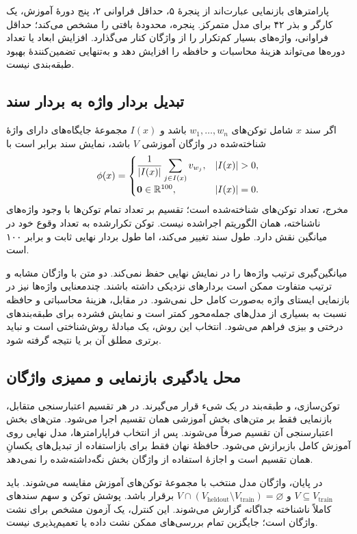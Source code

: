 پارامترهای بازنمایی عبارت‌اند از پنجرۀ ۵، حداقل فراوانی ۲، پنج دورۀ آموزش، یک کارگر و بذر ۴۲ برای مدل متمرکز. پنجره، محدودۀ بافتی را مشخص می‌کند؛ حداقل فراوانی، واژه‌های بسیار کم‌تکرار را از واژگان کنار می‌گذارد. افزایش ابعاد یا تعداد دوره‌ها می‌تواند هزینۀ محاسبات و حافظه را افزایش دهد و به‌تنهایی تضمین‌کنندۀ بهبود طبقه‌بندی نیست.

\subsection{تبدیل بردار واژه به بردار سند}
اگر سند $x$ شامل توکن‌های $w_1,\ldots,w_n$ باشد و $I(x)$ مجموعۀ جایگاه‌های دارای واژۀ شناخته‌شده در واژگان آموزشی $V$ باشد، نمایش سند برابر است با
\begin{equation}
\phi(x)=
\begin{cases}
\displaystyle\frac{1}{|I(x)|}\sum_{j\in I(x)}v_{w_j},&|I(x)|>0,\\[5pt]
\mathbf0\in\R^{100},&|I(x)|=0.
\end{cases}
\label{eq:document-embedding}
\end{equation}
مخرج، تعداد توکن‌های شناخته‌شده است؛ تقسیم بر تعداد تمام توکن‌ها با وجود واژه‌های ناشناخته، همان الگوریتم اجراشده نیست. توکن تکرارشده به تعداد وقوع خود در میانگین نقش دارد. طول سند تغییر می‌کند، اما طول بردار نهایی ثابت و برابر ۱۰۰ است.

میانگین‌گیری ترتیب واژه‌ها را در نمایش نهایی حفظ نمی‌کند. دو متن با واژگان مشابه و ترتیب متفاوت ممکن است بردارهای نزدیکی داشته باشند. چندمعنایی واژه‌ها نیز در بازنمایی ایستای واژه به‌صورت کامل حل نمی‌شود. در مقابل، هزینۀ محاسباتی و حافظه نسبت به بسیاری از مدل‌های جمله‌محور کمتر است و نمایش فشرده برای طبقه‌بندهای درختی و بیزی فراهم می‌شود. انتخاب این روش، یک مبادلۀ روش‌شناختی است و نباید برتری مطلق آن بر  یا  نتیجه گرفته شود.

\subsection{محل یادگیری بازنمایی و ممیزی واژگان}
توکن‌سازی،  و طبقه‌بند در یک شیء  قرار می‌گیرند. در هر تقسیم اعتبارسنجی متقابل،  بازنمایی فقط بر متن‌های بخش آموزشی همان تقسیم اجرا می‌شود. متن‌های بخش اعتبارسنجی آن تقسیم صرفاً  می‌شوند. پس از انتخاب فراپارامترها، مدل نهایی روی آموزش کامل بازبرازش می‌شود. حافظۀ نهان فقط برای بازاستفاده از تبدیل‌های یکسانِ همان تقسیم است و اجازۀ استفاده از واژگان بخش نگه‌داشته‌شده را نمی‌دهد.

در پایان، واژگان مدل منتخب با مجموعۀ توکن‌های آموزش مقایسه می‌شوند. باید $V\subseteq V_{\mathrm{train}}$ و $V\cap(V_{\mathrm{heldout}}\setminus V_{\mathrm{train}})=\varnothing$ برقرار باشد. پوشش توکن و سهم سندهای کاملاً ناشناخته جداگانه گزارش می‌شوند. این کنترل، یک آزمون مشخص برای نشت واژگان است؛ جایگزین تمام بررسی‌های ممکن نشت داده یا تعمیم‌پذیری نیست.

